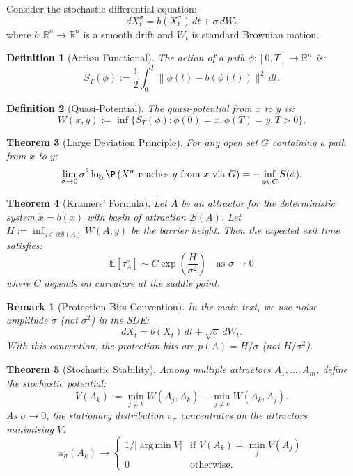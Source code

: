 \documentclass[12pt]{article}
\newtheorem{theorem}{Theorem}[section]
\newtheorem{definition}[theorem]{Definition}
\newtheorem{remark}{Remark}[section]
\newcommand{\R}{\mathbb{R}}
\newcommand{\E}{\mathbb{E}}
\DeclareMathOperator*{\argmin}{arg\,min}
\begin{document}
Consider the stochastic differential equation:
\[
dX_t^\sigma = b(X_t^\sigma) \, dt + \sigma \, dW_t
\]
where $b: \R^n \to \R^n$ is a smooth drift and $W_t$ is standard Brownian motion.

\begin{definition}[Action Functional]
The \emph{action} of a path $\phi: [0, T] \to \R^n$ is:
\[
S_T(\phi) := \frac{1}{2} \int_0^T \|\dot{\phi}(t) - b(\phi(t))\|^2 \, dt.
\]
\end{definition}

\begin{definition}[Quasi-Potential]
The \emph{quasi-potential} from $x$ to $y$ is:
\[
W(x, y) := \inf\{ S_T(\phi) : \phi(0) = x, \phi(T) = y, T > 0 \}.
\]
\end{definition}

\begin{theorem}[Large Deviation Principle]
\label{thm:ldp}
For any open set $G$ containing a path from $x$ to $y$:
\[
\lim_{\sigma \to 0} \sigma^2 \log \P\left( X^\sigma \text{ reaches } y \text{ from } x \text{ via } G \right) = -\inf_{\phi \in G} S(\phi).
\]
\end{theorem}

\begin{theorem}[Kramers' Formula]
\label{thm:kramers}
Let $A$ be an attractor for the deterministic system $\dot{x} = b(x)$ with basin of attraction $\mathcal{B}(A)$. Let $H := \inf_{y \in \partial \mathcal{B}(A)} W(A, y)$ be the barrier height. Then the expected exit time satisfies:
\[
\E[\tau_A^\sigma] \sim C \exp\left( \frac{H}{\sigma^2} \right) \quad \text{as } \sigma \to 0
\]
where $C$ depends on curvature at the saddle point.
\end{theorem}

\begin{remark}[Protection Bits Convention]
In the main text, we use noise amplitude $\sigma$ (not $\sigma^2$) in the SDE:
\[
dX_t = b(X_t) \, dt + \sqrt{\sigma} \, dW_t.
\]
With this convention, the protection bits are $p(A) = H / \sigma$ (not $H / \sigma^2$).
\end{remark}

\begin{theorem}[Stochastic Stability]
\label{thm:stochastic-stability}
Among multiple attractors $A_1, \ldots, A_m$, define the \emph{stochastic potential}:
\[
V(A_k) := \min_{j \neq k} W(A_j, A_k) - \min_{j \neq k} W(A_k, A_j).
\]
As $\sigma \to 0$, the stationary distribution $\pi_\sigma$ concentrates on the attractors minimising $V$:
\[
\pi_\sigma(A_k) \to \begin{cases} 1/|\argmin V| & \text{if } V(A_k) = \min_j V(A_j) \\ 0 & \text{otherwise.} \end{cases}
\]
\end{theorem}
\end{document}
